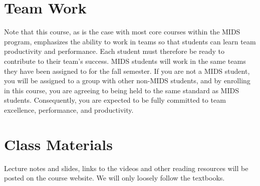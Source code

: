 \documentclass[11pt, a4paper]{article}
\begin{document}
\section{Team Work}
Note that this course, as is the case with most core courses within the MIDS program, emphasizes the ability to work in teams so that students can learn team productivity and performance. Each student must therefore be ready to contribute to their team's success. MIDS students will work in the same teams they have been assigned to for the fall semester. If you are not a MIDS student, you will be assigned to a group with other non-MIDS students, and by enrolling in this course, you are agreeing to being held to the same standard as MIDS students. Consequently,  you are expected to be fully committed to team excellence, performance, and productivity.


\section{Class Materials}
Lecture notes and slides, links to the videos and other reading resources will be posted on the course website. We will only loosely follow the textbooks.
\end{document}

